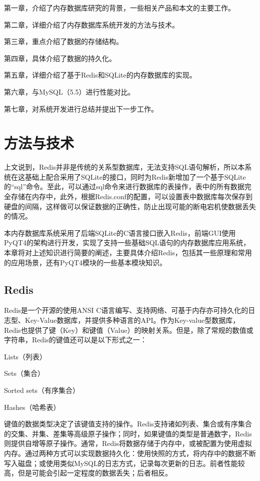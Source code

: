 \documentclass{zjutthesis}
\begin{document}
第一章，介绍了内存数据库研究的背景，一些相关产品和本文的主要工作。

第二章，详细介绍了内存数据库系统开发的方法与技术。

第三章，重点介绍了数据的存储结构。

第四章，具体介绍了数据的持久化。

第五章，详细介绍了基于Redis和SQLite的内存数据库的实现。

第六章，与MySQL（5.5）进行性能对比。

第七章，对系统开发进行总结并提出下一步工作。


\chapter{方法与技术}
上文说到，Redis并非是传统的关系型数据库，无法支持SQL语句解析，所以本系统在这基础上配合采用了SQLite的接口，同时为Redis新增加了一个基于SQLite的“sql”命令。至此，可以通过sql命令来进行数据库的表操作，表中的所有数据完全存储在内存中，此外，根据Redis.conf的配置，可以设置表中数据库每次保存到硬盘的间隔，这样做可以保证数据的正确性，防止出现可能的断电宕机使数据丢失的情况。

本内存数据库系统采用了后端SQLite的C语言接口嵌入Redis，前端GUI使用PyQT4的架构进行开发，实现了支持一些基础SQL语句的内存数据库应用系统，本章将对上述知识进行简要的阐述，主要具体介绍Redis，包括其一些原理和常用的应用场景，还有PyQT4模块的一些基本模块知识。

\section{Redis}
Redis是一个开源的使用ANSI C语言编写、支持网络、可基于内存亦可持久化的日志型、Key-Value数据库，并提供多种语言的API。作为Key-value型数据库，Redis也提供了键（Key）和键值（Value）的映射关系。但是，除了常规的数值或字符串，Redis的键值还可以是以下形式之一：

Lists（列表）

Sets（集合）

Sorted sets（有序集合）

Hashes（哈希表）

键值的数据类型决定了该键值支持的操作。Redis支持诸如列表、集合或有序集合的交集、并集、差集等高级原子操作；同时，如果键值的类型是普通数字，Redis则提供自增等原子操作。通常，Redis将数据存储于内存中，或被配置为使用虚拟内存。通过两种方式可以实现数据持久化：使用快照的方式，将内存中的数据不断写入磁盘；或使用类似MySQL的日志方式\cite{李晨光2010利用日志进行}，记录每次更新的日志。前者性能较高，但是可能会引起一定程度的数据丢失；后者相反。
\end{document}

